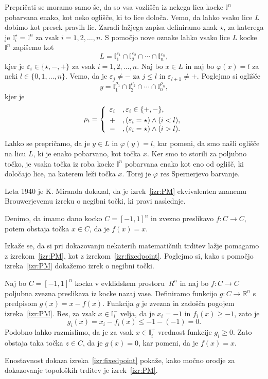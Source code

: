 \documentclass[mat1]{fmfdelo}
\newcommand{\R}{\mathbb R}
\newcommand{\I}{\mathbb I}
\newcommand{\0}{\underline{0}}
\begin{document}
\begin{dokaz}
Prepričati se moramo samo še, da so vsa vozlišča iz nekega lica kocke $\I^n$ pobarvana enako, kot neko oglišče, ki to lice določa. Vemo, da lahko vsako lice $L$ dobimo kot presek pravih lic. Zaradi lažjega zapisa definiramo znak $\star$, za katerega je $\I_i^{\star} = \I^n$ za vsak $i = 1, 2, \dots, n$. S pomočjo nove oznake lahko vsako lice $L$ kocke $\I^n$ zapišemo kot 
$$L = \I_1^{\varepsilon_1} \cap \I_2^{\varepsilon_2} \cap \cdots \cap \I_n^{\varepsilon_n},$$
kjer je $\varepsilon_i \in \{ \star, -, + \}$ za vsak $i = 1, 2, \dots, n$. Naj bo $x \in L$ in naj bo $\varphi (x) = l$ za neki $l \in \{ 0, 1, \dots, n \}$. Vemo, da je $\varepsilon_j \neq -$ za $j \leq l$ in $\varepsilon_{l+1} \neq +$. Poglejmo si oglišče 
$$y = \I_1^{\rho_1} \cap \I_2^{\rho_2} \cap \cdots \cap \I_n^{\rho_n},$$
kjer je
\[  \rho_i =  \left\{
\begin{array}{cl}\vspace{3pt}
	\varepsilon_i &, \varepsilon_i \in \{ +, - \},\\
	+ &, (\varepsilon_i = \star) \land (i < l), \\
	- &, (\varepsilon_i = \star) \land (i > l). \\
\end{array} 
\right. \]
Lahko se prepričamo, da je $y \in L$ in $\varphi (y) = l$, kar pomeni, da smo našli oglišče na licu $L$, ki je enako pobarvano, kot točka $x$. Ker smo to storili za poljubno točko, je vsaka točka iz roba kocke $\I^n$ pobarvana enako kot eno od oglišč, ki določajo lice, na katerem leži točka $x$. Torej je $\varphi$ res Spernerjevo barvanje.
\end{dokaz}
Leta 1940 je K. Miranda dokazal, da je izrek~\ref{izr:PM} ekvivalenten znanemu Brouwerjevemu izreku o negibni točki, ki pravi naslednje.
\begin{izrek}\label{izr:fixedpoint}
Denimo, da imamo dano kocko $C = [-1, 1]^n$ in zvezno preslikavo $f : C \to C$, potem obstaja točka $x \in C$, da je $f(x) = x$.
\end{izrek}
Izkaže se, da si pri dokazovanju nekaterih matematičnih trditev lažje pomagamo z izrekom~\ref{izr:PM}, kot z izrekom~\ref{izr:fixedpoint}. Poglejmo si, kako s pomočjo izreka~\ref{izr:PM} dokažemo izrek o negibni točki. 

\begin{dokaz}
Naj bo $C = [-1, 1]^n$ kocka v evklidskem prostoru $~R^n$ in naj bo $f : C \to C$ poljubna zvezna preslikava iz kocke nazaj vase. Definiramo funkcijo $g : C \to \R^n$ s predpisom $g(x) = x - f(x)$. Funkcija $g$ je zvezna in zadošča pogojem izreka~\ref{izr:PM}. Res, za vsak $x \in \I_i^-$ velja, da je $x_i = -1$ in $f_i(x) \geq -1$, zato je 
$$g_i(x) = x_i - f_i(x) \leq -1 - (-1) =0.$$
 Podobno lahko razmislimo, da je za vsak $x \in \I_i^+$ vrednost funkcije $g_i \geq 0$. Zato obstaja taka točka $z \in C$, da je $g(x) = 0$, kar pomeni, da je $f(x) = x$.
\end{dokaz}
Enostavnost dokaza izreka~\ref{izr:fixedpoint} pokaže, kako močno orodje za dokazovanje topoloških trditev je izrek~\ref{izr:PM}.
\end{document}
